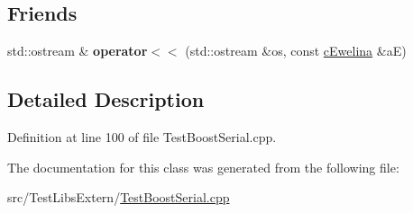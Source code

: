 \subsection*{Friends}
\begin{DoxyCompactItemize}
\item 
std\+::ostream \& {\bfseries operator$<$$<$} (std\+::ostream \&os, const \hyperlink{classMMVII_1_1cEwelina}{c\+Ewelina} \&aE)\hypertarget{classMMVII_1_1cEwelina_a720876ae955d7f9b68e358b23fdaf27d}{}\label{classMMVII_1_1cEwelina_a720876ae955d7f9b68e358b23fdaf27d}

\end{DoxyCompactItemize}


\subsection{Detailed Description}


Definition at line 100 of file Test\+Boost\+Serial.\+cpp.



The documentation for this class was generated from the following file\+:\begin{DoxyCompactItemize}
\item 
src/\+Test\+Libs\+Extern/\hyperlink{TestBoostSerial_8cpp}{Test\+Boost\+Serial.\+cpp}\end{DoxyCompactItemize}
